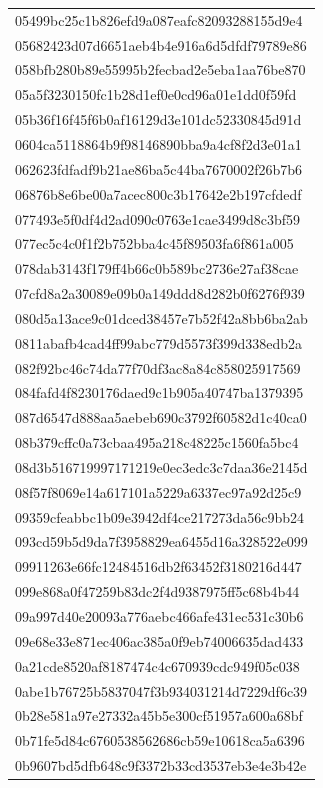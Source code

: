 \begin{tabular}{l}
05499bc25c1b826efd9a087eafc82093288155d9e4 \\
05682423d07d6651aeb4b4e916a6d5dfdf79789e86 \\
058bfb280b89e55995b2fecbad2e5eba1aa76be870 \\
05a5f3230150fc1b28d1ef0e0cd96a01e1dd0f59fd \\
05b36f16f45f6b0af16129d3e101dc52330845d91d \\
0604ca5118864b9f98146890bba9a4cf8f2d3e01a1 \\
062623fdfadf9b21ae86ba5c44ba7670002f26b7b6 \\
06876b8e6be00a7acec800c3b17642e2b197cfdedf \\
077493e5f0df4d2ad090c0763e1cae3499d8c3bf59 \\
077ec5c4c0f1f2b752bba4c45f89503fa6f861a005 \\
078dab3143f179ff4b66c0b589bc2736e27af38cae \\
07cfd8a2a30089e09b0a149ddd8d282b0f6276f939 \\
080d5a13ace9c01dced38457e7b52f42a8bb6ba2ab \\
0811abafb4cad4ff99abc779d5573f399d338edb2a \\
082f92bc46c74da77f70df3ac8a84c858025917569 \\
084fafd4f8230176daed9c1b905a40747ba1379395 \\
087d6547d888aa5aebeb690c3792f60582d1c40ca0 \\
08b379cffc0a73cbaa495a218c48225c1560fa5bc4 \\
08d3b516719997171219e0ec3edc3c7daa36e2145d \\
08f57f8069e14a617101a5229a6337ec97a92d25c9 \\
09359cfeabbc1b09e3942df4ce217273da56c9bb24 \\
093cd59b5d9da7f3958829ea6455d16a328522e099 \\
09911263e66fc12484516db2f63452f3180216d447 \\
099e868a0f47259b83dc2f4d9387975ff5c68b4b44 \\
09a997d40e20093a776aebc466afe431ec531c30b6 \\
09e68e33e871ec406ac385a0f9eb74006635dad433 \\
0a21cde8520af8187474c4c670939cdc949f05c038 \\
0abe1b76725b5837047f3b934031214d7229df6c39 \\
0b28e581a97e27332a45b5e300cf51957a600a68bf \\
0b71fe5d84c6760538562686cb59e10618ca5a6396 \\
0b9607bd5dfb648c9f3372b33cd3537eb3e4e3b42e \\

\end{tabular}
